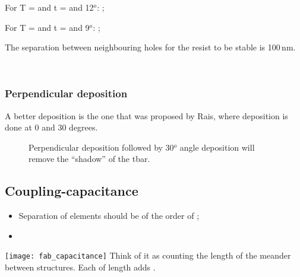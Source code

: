 \begin{framed}\noindent
  For T  =  and  t =  and  12$^o$: \hfill
  ;

  \noindent For T =   and t =  and 9$^o$:
  \hfill {};

  The separation between neighbouring holes for the resist to be stable
  is 100\,nm.



\begin{center}
   \\
\end{center}
\end{framed}

\subsubsection{Perpendicular deposition}
\label{sec:perp-depos}

A  better deposition  is  the  one that  was  proposed  by Rais,  where
deposition is done at 0 and 30 degrees.
\begin{figure}[h]
  \centering {}
  \caption{\small  Perpendicular deposition  followed  by 30$^o$  angle
    deposition     will     remove     the    ``shadow''     of     the
    tbar.\label{fig:0and30}}
\end{figure}


\subsection{Coupling-capacitance}
\label{sec:coupling-capacitance}

\begin{framed}\noindent
  \begin{itemize}
  \item   Separation  of   elements   should  be   of   the  order   of
    ;
  \item  {}
  \end{itemize}

   \begin{center}
     \texttt{[image: fab\_capacitance]} {\small  Think of it
       as counting the length of  the meander between structures.  Each
                  of            length           adds
       .\label{fig:example-image-c}}
   \end{center}
 \end{framed}


